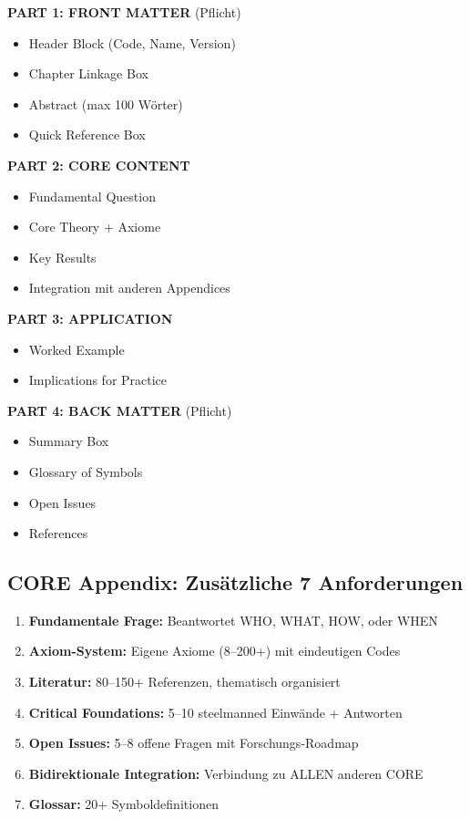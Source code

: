 \documentclass[12pt,a4paper]{article}
\begin{document}
\begin{tcolorbox}[colback=bcmgreen!5!white, colframe=bcmgreen!75!black]
\textbf{PART 1: FRONT MATTER} (Pflicht)
\begin{itemize}[nosep]
\item Header Block (Code, Name, Version)
\item Chapter Linkage Box
\item Abstract (max 100 Wörter)
\item Quick Reference Box
\end{itemize}

\textbf{PART 2: CORE CONTENT}
\begin{itemize}[nosep]
\item Fundamental Question
\item Core Theory + Axiome
\item Key Results
\item Integration mit anderen Appendices
\end{itemize}

\textbf{PART 3: APPLICATION}
\begin{itemize}[nosep]
\item Worked Example
\item Implications for Practice
\end{itemize}

\textbf{PART 4: BACK MATTER} (Pflicht)
\begin{itemize}[nosep]
\item Summary Box
\item Glossary of Symbols
\item Open Issues
\item References
\end{itemize}
\end{tcolorbox}

\subsection{CORE Appendix: Zusätzliche 7 Anforderungen}

\begin{tcolorbox}[colback=bcmred!5!white, colframe=bcmred!75!black,
    title=\textbf{Ein Appendix wird CORE wenn er ALLE 7 erfüllt:}]

\begin{enumerate}
\item \textbf{Fundamentale Frage:} Beantwortet WHO, WHAT, HOW, oder WHEN
\item \textbf{Axiom-System:} Eigene Axiome (8--200+) mit eindeutigen Codes
\item \textbf{Literatur:} 80--150+ Referenzen, thematisch organisiert
\item \textbf{Critical Foundations:} 5--10 steelmanned Einwände + Antworten
\item \textbf{Open Issues:} 5--8 offene Fragen mit Forschungs-Roadmap
\item \textbf{Bidirektionale Integration:} Verbindung zu ALLEN anderen CORE
\item \textbf{Glossar:} 20+ Symboldefinitionen
\end{enumerate}

\end{tcolorbox}
\end{document}
